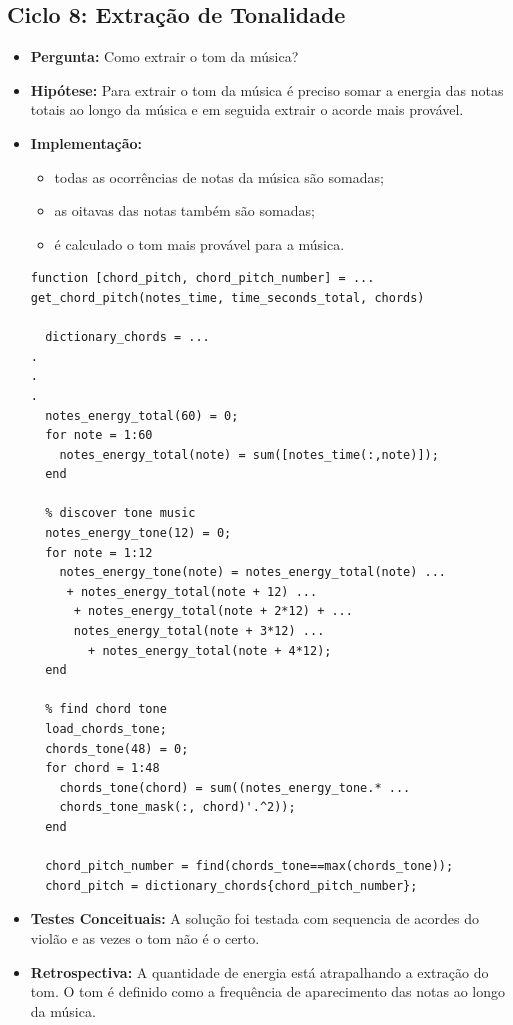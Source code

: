 \subsection{Ciclo 8: Extração de Tonalidade}
\label{subsec:ciclo_8}
\begin{itemize}
\item \textbf{Pergunta:} Como extrair o tom da música?
\item \textbf{Hipótese:} Para extrair o tom da música é preciso somar a energia das notas totais ao longo da música e em seguida extrair o acorde mais provável.
\item \textbf{Implementação:}
\begin{itemize} 
	\item todas as ocorrências de notas da música são somadas;
	\item as oitavas das notas também são somadas;
	\item é calculado o tom mais provável para a música.
\end{itemize}
\begin{lstlisting}
function [chord_pitch, chord_pitch_number] = ...
get_chord_pitch(notes_time, time_seconds_total, chords)
  
  dictionary_chords = ...
.
.
.
  notes_energy_total(60) = 0;
  for note = 1:60
    notes_energy_total(note) = sum([notes_time(:,note)]);
  end

  % discover tone music
  notes_energy_tone(12) = 0;
  for note = 1:12
    notes_energy_tone(note) = notes_energy_total(note) ...
     + notes_energy_total(note + 12) ...
      + notes_energy_total(note + 2*12) + ...
      notes_energy_total(note + 3*12) ...
        + notes_energy_total(note + 4*12);
  end

  % find chord tone
  load_chords_tone;
  chords_tone(48) = 0;
  for chord = 1:48
    chords_tone(chord) = sum((notes_energy_tone.* ...
    chords_tone_mask(:, chord)'.^2));
  end

  chord_pitch_number = find(chords_tone==max(chords_tone));
  chord_pitch = dictionary_chords{chord_pitch_number};
\end{lstlisting}
\item \textbf{Testes Conceituais:} A solução foi testada com sequencia de acordes do violão e as vezes o tom não é o certo.
\item \textbf{Retrospectiva:} A quantidade de energia está atrapalhando a extração do tom. O tom é definido como a frequência de aparecimento das notas ao longo da música.
\end{itemize}

